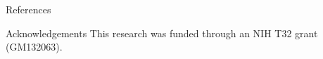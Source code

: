 \documentclass[final]{beamer}
\newlength{\onecolwid}
\begin{document}
\begin{frame}[t]
\begin{columns}[t]
\begin{column}{\onecolwid}
\begin{block}{References}
	\begin{tiny}
		
		
	\end{tiny}
\end{block}

\begin{block}{Acknowledgements}
This research was funded through an NIH T32 grant (GM132063).
\end{block}



\end{column} %
\end{columns} %
\end{frame} %
\end{document}
